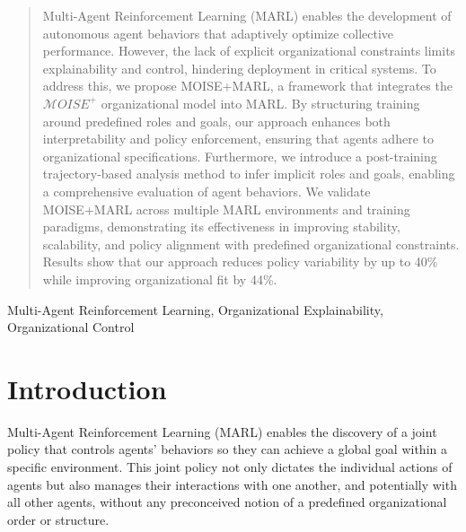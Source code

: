 \documentclass[conference]{IEEEtran}
\begin{document}
\maketitle

\begin{abstract}
    Multi-Agent Reinforcement Learning (MARL) enables the development of autonomous agent behaviors that adaptively optimize collective performance. However, the lack of explicit organizational constraints limits explainability and control, hindering deployment in critical systems. To address this, we propose MOISE+MARL, a framework that integrates the $\mathcal{M}OISE^+$ organizational model into MARL. By structuring training around predefined roles and goals, our approach enhances both interpretability and policy enforcement, ensuring that agents adhere to organizational specifications. Furthermore, we introduce a post-training trajectory-based analysis method to infer implicit roles and goals, enabling a comprehensive evaluation of agent behaviors. 
    We validate MOISE+MARL across multiple MARL environments and training paradigms, demonstrating its effectiveness in improving stability, scalability, and policy alignment with predefined organizational constraints. Results show that our approach reduces policy variability by up to 40\% while improving organizational fit by 44\%.
    

\end{abstract}

\begin{IEEEkeywords}
    Multi-Agent Reinforcement Learning, Organizational Explainability, Organizational Control
\end{IEEEkeywords}

\section{Introduction}

Multi-Agent Reinforcement Learning (MARL) enables the discovery of a joint policy that controls agents' behaviors so they can achieve a global goal within a specific environment. 
This joint policy not only dictates the individual actions of agents but also manages their interactions with one another, and potentially with all other agents, without any preconceived notion of a predefined organizational order or structure.
\end{document}
